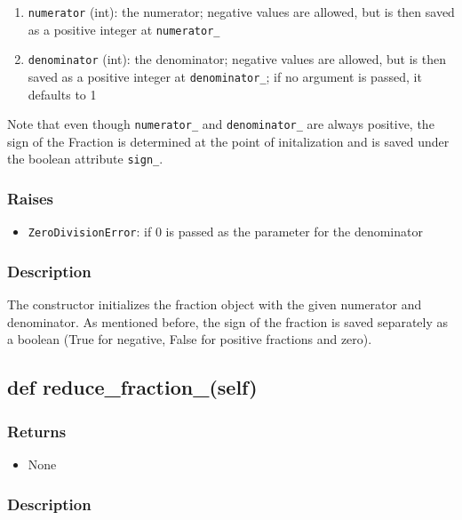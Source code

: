\documentclass[refman]{scrartcl}
\begin{document}
\begin{enumerate}
  \item \texttt{numerator} (int): the numerator; negative values are allowed, but is then saved as a positive integer at \texttt{numerator\_}
  \item \texttt{denominator} (int): the denominator; negative values are allowed, but is then saved as a positive integer at \texttt{denominator\_}; if no argument is passed, it defaults to 1
\end{enumerate}

Note that even though \texttt{numerator\_} and \texttt{denominator\_} are always positive, the sign of the Fraction is determined at the point of initalization and is saved under the boolean attribute \texttt{sign\_}.

\subsubsection*{Raises}

\begin{itemize}
  \item \texttt{ZeroDivisionError}: if \(0\) is passed as the parameter for the denominator
\end{itemize}

\subsubsection*{Description}

The constructor initializes the fraction object with the given numerator and denominator. As mentioned before, the sign of the fraction is saved separately as a boolean (True for negative, False for positive fractions and zero). 

\subsection{def reduce\_fraction\_(self)}

\subsubsection*{Returns}

\begin{itemize}
	\item None
\end{itemize}

\subsubsection*{Description}
\end{document}
